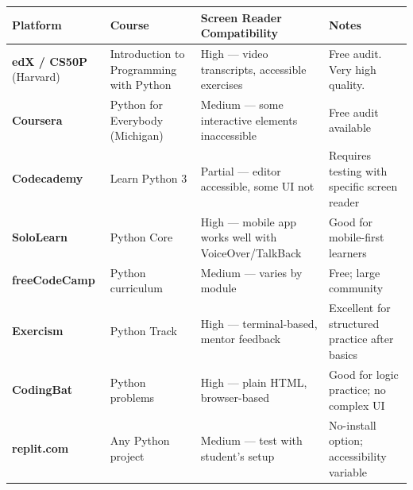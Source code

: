 \documentclass[
  justified,
  openright,
]{tufte-book}
\begin{document}
{\def\LTcaptype{none} %
\begin{longtable}[]{@{}
  >{\raggedright\arraybackslash}p{}
  >{\raggedright\arraybackslash}p{}
  >{\raggedright\arraybackslash}p{}
  >{\raggedright\arraybackslash}p{}@{}}
\toprule\noalign{}
\begin{minipage}[b]{\linewidth}\raggedright
Platform
\end{minipage} & \begin{minipage}[b]{\linewidth}\raggedright
Course
\end{minipage} & \begin{minipage}[b]{\linewidth}\raggedright
Screen Reader Compatibility
\end{minipage} & \begin{minipage}[b]{\linewidth}\raggedright
Notes
\end{minipage} \\
\midrule\noalign{}
\endhead
\bottomrule\noalign{}
\endlastfoot
\textbf{edX / CS50P} (Harvard) & Introduction to Programming with Python
& High --- video transcripts, accessible exercises & Free audit. Very
high quality. \\
\textbf{Coursera} & Python for Everybody (Michigan) & Medium --- some
interactive elements inaccessible & Free audit available \\
\textbf{Codecademy} & Learn Python 3 & Partial --- editor accessible,
some UI not & Requires testing with specific screen reader \\
\textbf{SoloLearn} & Python Core & High --- mobile app works well with
VoiceOver/TalkBack & Good for mobile-first learners \\
\textbf{freeCodeCamp} & Python curriculum & Medium --- varies by module
& Free; large community \\
\textbf{Exercism} & Python Track & High --- terminal-based, mentor
feedback & Excellent for structured practice after basics \\
\textbf{CodingBat} & Python problems & High --- plain HTML,
browser-based & Good for logic practice; no complex UI \\
\textbf{replit.com} & Any Python project & Medium --- test with
student's setup & No-install option; accessibility variable \\
\end{longtable}
}
\end{document}
